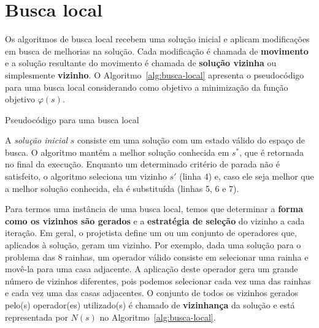 \section{Busca local}

Os algoritmos de busca local recebem uma solução inicial e aplicam modificações em busca de melhorias na solução. Cada modificação é chamada de \textbf{movimento} e a solução resultante do movimento é chamada de \textbf{solução vizinha} ou simplesmente \textbf{vizinho}. O Algoritmo~\ref{alg:busca-local} apresenta o pseudocódigo para uma busca local considerando como objetivo a minimização da função objetivo $\varphi(s)$.

\begin{algorithm}[h]
	\DontPrintSemicolon
	
	
	\caption{Pseudocódigo para uma busca local}
	\label{alg:busca-local}
\end{algorithm}

A \textit{solução inicial} $s$ consiste em uma solução com um estado válido do espaço de busca. O algoritmo mantém a melhor solução conhecida em $s^*$, que é retornada no final da execução. Enquanto um determinado critério de parada não é satisfeito, o algoritmo seleciona um vizinho $s'$ (linha 4) e, caso ele seja melhor que a melhor solução conhecida, ela é substituída (linhas 5, 6 e 7).

Para termos uma instância de uma busca local, temos que determinar a \textbf{forma como os vizinhos são gerados} e a \textbf{estratégia de seleção} do vizinho a cada iteração. Em geral, o projetista define um ou um conjunto de operadores que, aplicados à solução, geram um vizinho. Por exemplo, dada uma solução para o problema das 8 rainhas, um operador válido consiste em selecionar uma rainha e movê-la para uma casa adjacente. A aplicação deste operador gera um grande número de vizinhos diferentes, pois podemos selecionar cada vez uma das rainhas e cada vez uma das casas adjacentes. O conjunto de todos os vizinhos gerados pelo(s) operador(es) utilizado(s) é chamado de \textbf{vizinhança} da solução e está representada por $N(s)$ no Algoritmo~\ref{alg:busca-local}.

